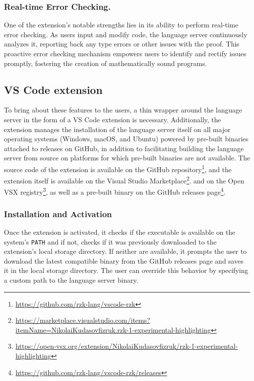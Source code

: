 \subsubsection{Real-time Error Checking.}

One of the extension's notable strengths lies in its ability to perform real-time error checking.
As users input and modify code, the language server continuously analyzes it,
reporting back any type errors or other issues with the proof.
This proactive error checking mechanism empowers users to identify and rectify issues promptly,
fostering the creation of mathematically sound programs.

\subsection{VS Code extension}

To bring about these features to the users, a thin wrapper around the language server in the form of a VS Code extension is necessary.
Additionally, the extension manages the installation of the language server itself on all major operating systems (Windows, macOS, and Ubuntu)
powered by pre-built binaries attached to releases on GitHub,
in addition to facilitating building the language server from source on platforms
for which pre-built binaries are not available.
The source code of the extension is available on the GitHub repository\footnote{
  \url{https://github.com/rzk-lang/vscode-rzk}},
and the extension itself is available on the Visual Studio Marketplace\footnote{
  \url{https://marketplace.visualstudio.com/items?itemName=NikolaiKudasovfizruk.rzk-1-experimental-highlighting}}.
and on the Open VSX registry\footnote{
  \url{https://open-vsx.org/extension/NikolaiKudasovfizruk/rzk-1-experimental-highlighting}},
as well as a pre-built binary on the GitHub releases page\footnote{
  \url{https://github.com/rzk-lang/vscode-rzk/releases}}.

\subsubsection{Installation and Activation}

Once the extension is activated, it checks if the \Rzk{} executable is available on the system's
\texttt{PATH} and if not, checks if it was previously downloaded to the extension's local storage directory.
If neither are available, it prompts the user to download the latest compatible binary from the GitHub
releases page and saves it in the local storage directory.
The user can override this behavior by specifying a custom path to the language server binary.

